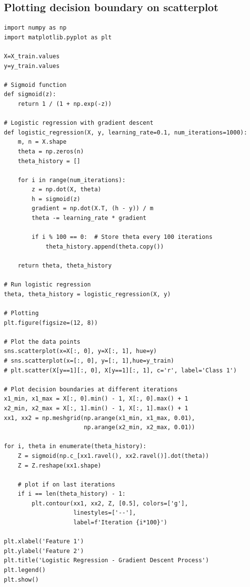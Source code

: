 \documentclass[stu,12pt,floatsintext]{apa7}
\begin{document}
\subsection{Plotting decision boundary on scatterplot}
\begin{lstlisting}[style=pythonstyle]
import numpy as np
import matplotlib.pyplot as plt

X=X_train.values
y=y_train.values

# Sigmoid function
def sigmoid(z):
    return 1 / (1 + np.exp(-z))

# Logistic regression with gradient descent
def logistic_regression(X, y, learning_rate=0.1, num_iterations=1000):
    m, n = X.shape
    theta = np.zeros(n)
    theta_history = []

    for i in range(num_iterations):
        z = np.dot(X, theta)
        h = sigmoid(z)
        gradient = np.dot(X.T, (h - y)) / m
        theta -= learning_rate * gradient
        
        if i % 100 == 0:  # Store theta every 100 iterations
            theta_history.append(theta.copy())
    
    return theta, theta_history

# Run logistic regression
theta, theta_history = logistic_regression(X, y)

# Plotting
plt.figure(figsize=(12, 8))

# Plot the data points
sns.scatterplot(x=X[:, 0], y=X[:, 1], hue=y)
# sns.scatterplot(x=[:, 0], y=[:, 1],hue=y_train)
# plt.scatter(X[y==1][:, 0], X[y==1][:, 1], c='r', label='Class 1')

# Plot decision boundaries at different iterations
x1_min, x1_max = X[:, 0].min() - 1, X[:, 0].max() + 1
x2_min, x2_max = X[:, 1].min() - 1, X[:, 1].max() + 1
xx1, xx2 = np.meshgrid(np.arange(x1_min, x1_max, 0.01),
                       np.arange(x2_min, x2_max, 0.01))

for i, theta in enumerate(theta_history):
    Z = sigmoid(np.c_[xx1.ravel(), xx2.ravel()].dot(theta))
    Z = Z.reshape(xx1.shape)
    
    # plot if on last iterations
    if i == len(theta_history) - 1:
        plt.contour(xx1, xx2, Z, [0.5], colors=['g'], 
                    linestyles=['--'], 
                    label=f'Iteration {i*100}')

plt.xlabel('Feature 1')
plt.ylabel('Feature 2')
plt.title('Logistic Regression - Gradient Descent Process')
plt.legend()
plt.show()
\end{lstlisting}
\end{document}
